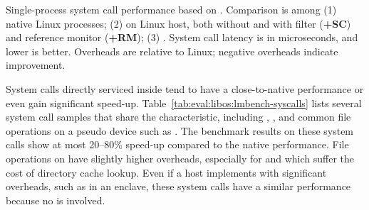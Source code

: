 \label{sec:eval:libos:syscalls}


\begin{table}[t!b!]

\caption{Single-process system call performance based on \lmbench{}. Comparison is among (1) native Linux processes; (2) \graphene{} on Linux host, both without and with \seccomp{} filter ({\bf +SC}) and reference monitor ({\bf +RM}); (3) \graphenesgx{}.
System call latency is in microseconds, and lower is better.
Overheads are relative to Linux; negative overheads indicate improvement.} 
\label{tab:eval:libos:lmbench-syscalls}
\end{table}


System calls directly serviced
inside \thelibos{}
tend to have a close-to-native performance
or even gain significant speed-up.
Table~\ref{tab:eval:libos:lmbench-syscalls}
lists several system call samples that share the characteristic,
including ,
, and common file operations on a pseudo device such as .
The benchmark results on these system calls
show at most 20--80\% speed-up
compared to the native performance.
File operations on  have
slightly higher overheads,
especially for  and 
which suffer the cost
of directory cache lookup.
Even if a host implements \thehostabi{} with significant overheads,
such as in an \sgx{} enclave,
these system calls have a similar performance because no \hostapi{} is involved.









